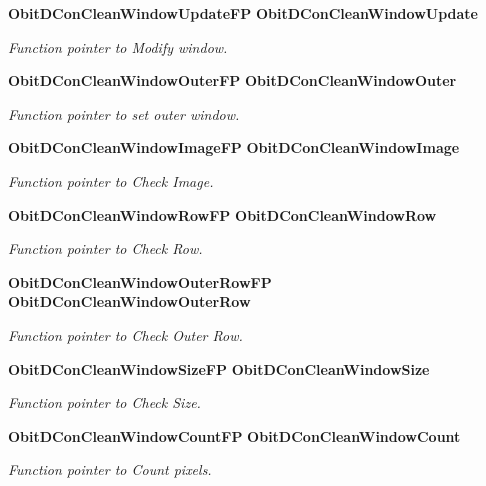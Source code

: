 \begin{CompactItemize}
{\bf Obit\-DCon\-Clean\-Window\-Update\-FP} {\bf Obit\-DCon\-Clean\-Window\-Update}
\begin{CompactList}\small\item\em Function pointer to Modify window. \item\end{CompactList}\item 
{\bf Obit\-DCon\-Clean\-Window\-Outer\-FP} {\bf Obit\-DCon\-Clean\-Window\-Outer}
\begin{CompactList}\small\item\em Function pointer to set outer window. \item\end{CompactList}\item 
{\bf Obit\-DCon\-Clean\-Window\-Image\-FP} {\bf Obit\-DCon\-Clean\-Window\-Image}
\begin{CompactList}\small\item\em Function pointer to Check Image. \item\end{CompactList}\item 
{\bf Obit\-DCon\-Clean\-Window\-Row\-FP} {\bf Obit\-DCon\-Clean\-Window\-Row}
\begin{CompactList}\small\item\em Function pointer to Check Row. \item\end{CompactList}\item 
{\bf Obit\-DCon\-Clean\-Window\-Outer\-Row\-FP} {\bf Obit\-DCon\-Clean\-Window\-Outer\-Row}
\begin{CompactList}\small\item\em Function pointer to Check Outer Row. \item\end{CompactList}\item 
{\bf Obit\-DCon\-Clean\-Window\-Size\-FP} {\bf Obit\-DCon\-Clean\-Window\-Size}
\begin{CompactList}\small\item\em Function pointer to Check Size. \item\end{CompactList}\item 
{\bf Obit\-DCon\-Clean\-Window\-Count\-FP} {\bf Obit\-DCon\-Clean\-Window\-Count}
\begin{CompactList}\small\item\em Function pointer to Count pixels. \item\end{CompactList}\item 

\end{CompactItemize}
